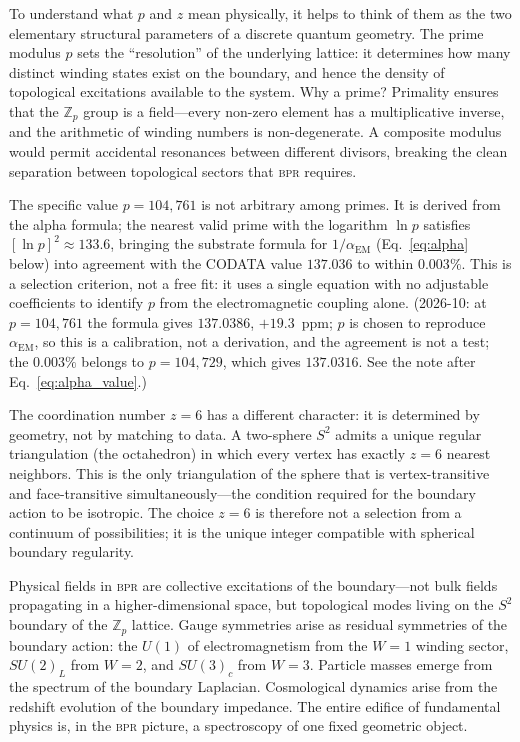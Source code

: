 \documentclass[aps,prd,twocolumn,superscriptaddress,longbibliography,nofootinbib]{revtex4-2}
\newcommand{\Zp}{\mathbb{Z}_p}
\newcommand{\Stwo}{S^2}
\newcommand{\alphaEM}{\alpha_{\mathrm{EM}}}
\newcommand{\bpr}{\textsc{bpr}}
\begin{document}
To understand what $p$ and $z$ mean physically, it helps to think of
them as the two elementary structural parameters of a discrete
quantum geometry.  The prime modulus $p$ sets the ``resolution'' of
the underlying lattice: it determines how many distinct winding
states exist on the boundary, and hence the density of topological
excitations available to the system.  Why a prime?  Primality ensures
that the $\Zp$ group is a field---every non-zero element has a
multiplicative inverse, and the arithmetic of winding numbers is
non-degenerate.  A composite modulus would permit accidental
resonances between different divisors, breaking the clean separation
between topological sectors that \bpr{} requires.

The specific value $p = 104{,}761$ is not arbitrary among primes.  It
is derived from the alpha formula; the nearest valid prime with the logarithm $\ln p$ satisfies
$[\ln p]^2 \approx 133.6$, bringing the substrate formula for
$1/\alphaEM$ (Eq.~\eqref{eq:alpha} below) into agreement with the
CODATA value $137.036$ to within $0.003\%$.  This is a selection
criterion, not a free fit: it uses a single equation with no adjustable
coefficients to identify $p$ from the electromagnetic coupling alone.
(2026-10: at $p = 104{,}761$ the formula gives $137.0386$, $+19.3$~ppm;
$p$ is chosen to reproduce $\alphaEM$, so this is a calibration, not a
derivation, and the agreement is not a test; the $0.003\%$ belongs to
$p = 104{,}729$, which gives $137.0316$.  See the note after
Eq.~\eqref{eq:alpha_value}.)

The coordination number $z = 6$ has a different character: it is
determined by geometry, not by matching to data.  A two-sphere
$\Stwo$ admits a unique regular triangulation (the octahedron) in
which every vertex has exactly $z = 6$ nearest neighbors.  This is
the only triangulation of the sphere that is vertex-transitive and
face-transitive simultaneously---the condition required for the
boundary action to be isotropic.  The choice $z = 6$ is therefore not
a selection from a continuum of possibilities; it is the unique
integer compatible with spherical boundary regularity.

Physical fields in \bpr{} are collective excitations of the
boundary---not bulk fields propagating in a higher-dimensional space,
but topological modes living on the $\Stwo$ boundary of the
$\Zp$ lattice.  Gauge symmetries arise as residual symmetries of the
boundary action: the $U(1)$ of electromagnetism from the $W = 1$
winding sector, $SU(2)_L$ from $W = 2$, and $SU(3)_c$ from $W = 3$.
Particle masses emerge from the spectrum of the boundary Laplacian.
Cosmological dynamics arise from the redshift evolution of the
boundary impedance.  The entire edifice of fundamental physics is, in
the \bpr{} picture, a spectroscopy of one fixed geometric object.
\end{document}
